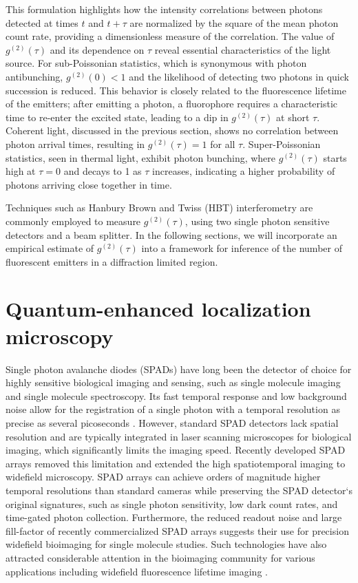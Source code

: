 This formulation highlights how the intensity correlations between photons detected at times $ t $ and $ t+\tau $ are normalized by the square of the mean photon count rate, providing a dimensionless measure of the correlation. The value of $ g^{(2)}(\tau) $ and its dependence on $ \tau $ reveal essential characteristics of the light source. For sub-Poissonian statistics, which is synonymous with photon antibunching, $ g^{(2)}(0) < 1$ and the likelihood of detecting two photons in quick succession is reduced. This behavior is closely related to the fluorescence lifetime of the emitters; after emitting a photon, a fluorophore requires a characteristic time to re-enter the excited state, leading to a dip in $ g^{(2)}(\tau) $ at short $ \tau $. Coherent light, discussed in the previous section, shows no correlation between photon arrival times, resulting in $ g^{(2)}(\tau) = 1 $ for all $ \tau $. Super-Poissonian statistics, seen in thermal light, exhibit photon bunching, where $ g^{(2)}(\tau) $ starts high at $ \tau = 0 $ and decays to 1 as $ \tau $ increases, indicating a higher probability of photons arriving close together in time.

Techniques such as Hanbury Brown and Twiss (HBT) interferometry are commonly employed to measure $ g^{(2)}(\tau) $, using two single photon sensitive detectors and a beam splitter. In the following sections, we will incorporate an empirical estimate of $g^{(2)}(\tau)$ into a framework for inference of the number of fluorescent emitters in a diffraction limited region. 

\section{Quantum-enhanced localization microscopy}

Single photon avalanche diodes (SPADs) have long been the detector of choice for highly sensitive biological imaging and sensing, such as single molecule imaging and single molecule spectroscopy. Its fast temporal response and low background noise allow for the registration of a single photon with a temporal resolution as precise as several picoseconds \parencite{Bruschini2019}. However, standard SPAD detectors lack spatial resolution and are typically integrated in laser scanning microscopes for biological imaging, which significantly limits the imaging speed. Recently developed SPAD arrays removed this limitation and extended the high spatiotemporal imaging to widefield microscopy. SPAD arrays can achieve orders of magnitude higher temporal resolutions than standard cameras while preserving the SPAD detector‘s original signatures, such as single photon sensitivity, low dark count rates, and time-gated photon collection. Furthermore, the reduced readout noise and large fill-factor of recently commercialized SPAD arrays suggests their use for precision widefield bioimaging for single molecule studies. Such technologies have also attracted considerable attention in the bioimaging community for various applications including widefield fluorescence lifetime imaging \parencite{Nedbal2024,Ulku2019,Zickus2020}.

